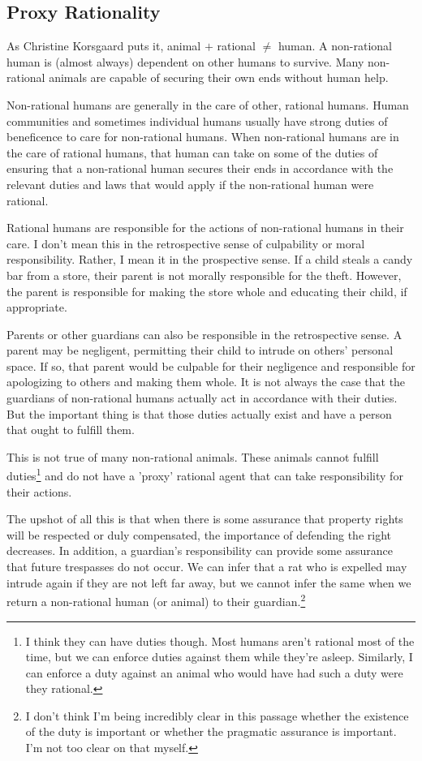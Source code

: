 \documentclass[12pt]{book}
\begin{document}
    \subsection{Proxy Rationality}
		As Christine Korsgaard puts it, animal $+$ rational $\neq$ human.
		A non-rational human is (almost always) dependent on other humans
		to survive. Many non-rational animals are capable of securing their
		own ends without human help.

		Non-rational humans are generally in the care of other, rational
		humans. Human communities and sometimes individual humans usually
		have strong duties of beneficence to care for non-rational humans.
		When non-rational humans are in the care of rational humans, that
		human can take on some of the duties of ensuring that a non-rational
		human secures their ends in accordance with the relevant duties
		and laws that would apply if the non-rational human were rational.

		Rational humans are responsible for the actions of non-rational
		humans in their care. I don't mean this in the retrospective sense
		of culpability or moral responsibility. Rather, I mean it in the
		prospective sense. If a child steals a candy bar from a store, their
		parent is not morally responsible for the theft. However, the parent
		is responsible for making the store whole and educating their child,
		if appropriate.

		Parents or other guardians can also be responsible in the retrospective
		sense. A parent may be negligent, permitting their child to intrude on
		others' personal space. If so, that parent would be culpable for their
		negligence and responsible for apologizing to others and making them
		whole.  It is not always the case that the guardians of non-rational
		humans actually act in accordance with their duties. But the important
		thing is that those duties actually exist and have a person that ought
		to fulfill them.

		This is not true of many non-rational animals. These animals cannot
		fulfill duties\footnote{I think they can have duties though. Most humans 
		aren't rational most of the time, but we can enforce duties against
		them while they're asleep. Similarly, I can enforce a duty against an animal
		who would have had such a duty were they rational.} and do not have
		a 'proxy' rational agent that can take responsibility for their
		actions.

		The upshot of all this is that when there is some assurance that
		property rights will be respected or duly compensated, the importance
		of defending the right decreases. In addition, a guardian's
		responsibility can provide some assurance that future trespasses do not
		occur. We can infer that a rat who is expelled may intrude again if
		they are not left far away, but we cannot infer the same when we return
		a non-rational human (or animal) to their guardian.\footnote{I don't
		think I'm being incredibly clear in this passage whether the existence
		of the duty is important or whether the pragmatic assurance is important.
		I'm not too clear on that myself.}
\end{document}
